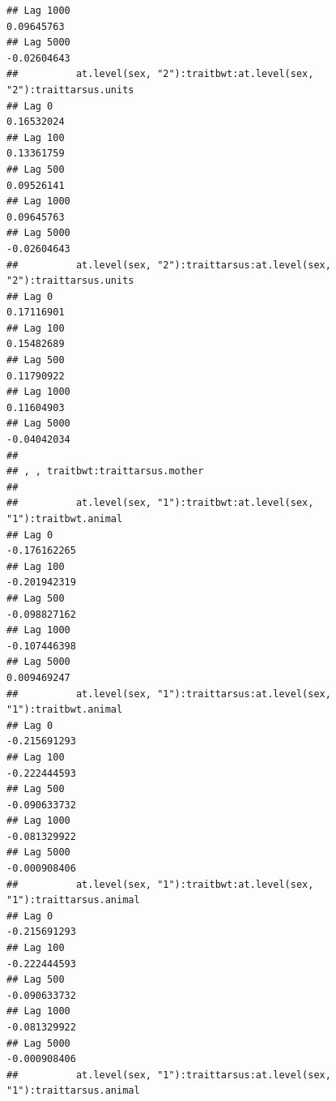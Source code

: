 \documentclass[
  12pt,
]{book}
\begin{document}
\begin{verbatim}
## Lag 1000                                                       0.09645763
## Lag 5000                                                      -0.02604643
##          at.level(sex, "2"):traitbwt:at.level(sex, "2"):traittarsus.units
## Lag 0                                                          0.16532024
## Lag 100                                                        0.13361759
## Lag 500                                                        0.09526141
## Lag 1000                                                       0.09645763
## Lag 5000                                                      -0.02604643
##          at.level(sex, "2"):traittarsus:at.level(sex, "2"):traittarsus.units
## Lag 0                                                             0.17116901
## Lag 100                                                           0.15482689
## Lag 500                                                           0.11790922
## Lag 1000                                                          0.11604903
## Lag 5000                                                         -0.04042034
## 
## , , traitbwt:traittarsus.mother
## 
##          at.level(sex, "1"):traitbwt:at.level(sex, "1"):traitbwt.animal
## Lag 0                                                      -0.176162265
## Lag 100                                                    -0.201942319
## Lag 500                                                    -0.098827162
## Lag 1000                                                   -0.107446398
## Lag 5000                                                    0.009469247
##          at.level(sex, "1"):traittarsus:at.level(sex, "1"):traitbwt.animal
## Lag 0                                                         -0.215691293
## Lag 100                                                       -0.222444593
## Lag 500                                                       -0.090633732
## Lag 1000                                                      -0.081329922
## Lag 5000                                                      -0.000908406
##          at.level(sex, "1"):traitbwt:at.level(sex, "1"):traittarsus.animal
## Lag 0                                                         -0.215691293
## Lag 100                                                       -0.222444593
## Lag 500                                                       -0.090633732
## Lag 1000                                                      -0.081329922
## Lag 5000                                                      -0.000908406
##          at.level(sex, "1"):traittarsus:at.level(sex, "1"):traittarsus.animal

\end{verbatim}
\end{document}
